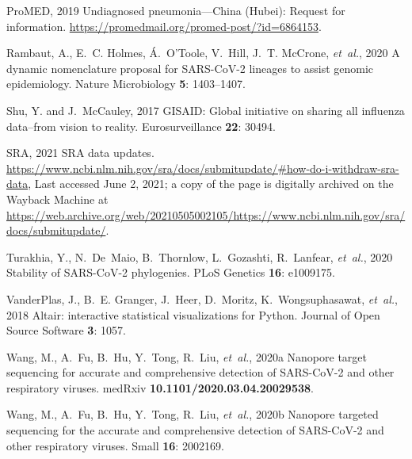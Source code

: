 \documentclass[9pt,twocolumn,twoside]{gsajnl_modified}
\begin{document}
\begin{thebibliography}{47}
{ProMED}, 2019 Undiagnosed pneumonia---{China (Hubei)}: Request for
  information. \url{https://promedmail.org/promed-post/?id=6864153}.

{Rambaut, A., E.~C. Holmes, {\'A}.~O’Toole, V.~Hill, J.~T. McCrone, {\em
  et~al.\/}}, 2020 A dynamic nomenclature proposal for {SARS-CoV-2} lineages to
  assist genomic epidemiology. Nature Microbiology {\bf 5}: 1403--1407.

{Shu, Y. {\rm and} J.~McCauley}, 2017 {GISAID}: Global initiative on sharing
  all influenza data--from vision to reality. Eurosurveillance {\bf 22}: 30494.

{SRA}, 2021 {SRA} data updates.
  \url{https://www.ncbi.nlm.nih.gov/sra/docs/submitupdate/#how-do-i-withdraw-sra-data},
  Last accessed June 2, 2021; a copy of the page is digitally archived on the
  Wayback Machine at
  \url{https://web.archive.org/web/20210505002105/https://www.ncbi.nlm.nih.gov/sra/docs/submitupdate/}.

{Turakhia, Y., N.~De~Maio, B.~Thornlow, L.~Gozashti, R.~Lanfear, {\em
  et~al.\/}}, 2020 Stability of {SARS-CoV-2} phylogenies. PLoS Genetics {\bf
  16}: e1009175.

{VanderPlas, J., B.~E. Granger, J.~Heer, D.~Moritz, K.~Wongsuphasawat, {\em
  et~al.\/}}, 2018 Altair: interactive statistical visualizations for {Python}.
  Journal of Open Source Software {\bf 3}: 1057.

{Wang, M., A.~Fu, B.~Hu, Y.~Tong, R.~Liu, {\em et~al.\/}}, 2020{a} Nanopore
  target sequencing for accurate and comprehensive detection of {SARS-CoV-2}
  and other respiratory viruses. medRxiv {\bf 10.1101/2020.03.04.20029538}.

{Wang, M., A.~Fu, B.~Hu, Y.~Tong, R.~Liu, {\em et~al.\/}}, 2020{b} Nanopore
  targeted sequencing for the accurate and comprehensive detection of
  {SARS-CoV-2} and other respiratory viruses. Small {\bf 16}: 2002169.


\end{thebibliography}
\end{document}
